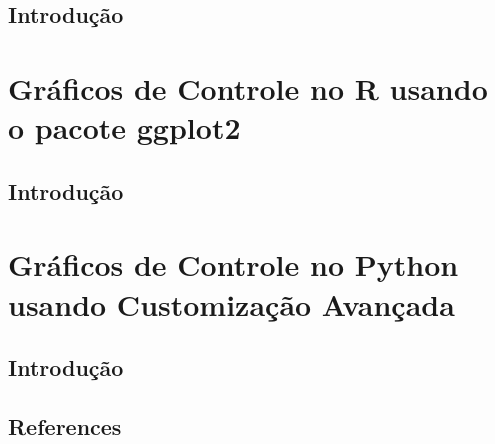 \documentclass[
  portuguese,
  11pt,
  a4paper,
  DIV=11,
  numbers=noendperiod]{scrreprt}
\begin{document}

\chapter{Introdução}\label{introduuxe7uxe3o-1}

\part{Gráficos de Controle no R usando o pacote ggplot2}


\chapter{Introdução}\label{introduuxe7uxe3o-2}

\part{Gráficos de Controle no Python usando Customização Avançada}


\chapter{Introdução}\label{introduuxe7uxe3o-3}


\chapter*{References}\label{references}


\label{refs}
\end{document}
